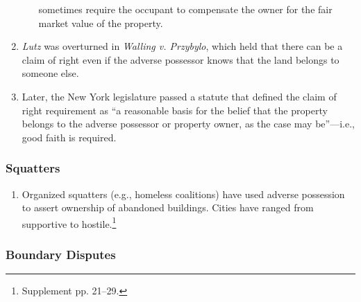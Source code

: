 \begin{enumerate}
\begin{enumerate}
        sometimes require the occupant to compensate the owner for the fair 
        market value of the property.
    \end{enumerate}
    \item \emph{Lutz} was overturned in \emph{Walling v. Przybylo}, which 
    held that there can be a claim of right even if the adverse possessor 
    knows that the land belongs to someone else.
    \item Later, the New York legislature passed a statute that defined the 
    claim of right requirement as ``a reasonable basis for the belief that the 
    property belongs to the adverse possessor or property owner, as the case 
    may be''---i.e., good faith is required.
\end{enumerate}

\subsubsection{Squatters}

\begin{enumerate}
    \item Organized squatters (e.g., homeless coalitions) have used adverse 
    possession to assert ownership of abandoned buildings. Cities have ranged 
    from supportive to hostile.\footnote{Supplement pp. 21--29.}
\end{enumerate}

\subsubsection{Boundary Disputes}

